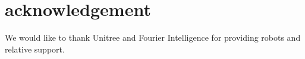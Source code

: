 \section{acknowledgement}
We would like to thank Unitree and Fourier Intelligence for providing robots and relative support.